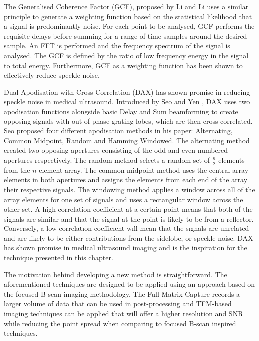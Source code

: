 The Generalised Coherence Factor (GCF), proposed by Li and Li\cite{li_adaptive_2003} uses a similar principle to generate a weighting function based on the statistical likelihood that a signal is predominantly noise. For each point to be analysed, GCF performs the requisite delays before summing for a range of time samples around the desired sample. An FFT is performed and the frequency spectrum of the signal is analysed. The GCF is defined by the ratio of low frequency energy in the signal to total energy. Furthermore, GCF as a weighting function has been shown to effectively reduce speckle noise.

Dual Apodisation with Cross-Correlation (DAX) has shown promise in reducing speckle noise in medical ultrasound. Introduced by Seo and Yen \cite{seo_sidelobe_2008}, DAX uses two apodisation functions alongside basic Delay and Sum beamforming to create opposing signals with out of phase grating lobes, which are then cross-correlated. Seo proposed four different apodisation methods in his paper: Alternating, Common Midpoint, Random and Hamming Windowed. The alternating method created two opposing apertures consisting of the odd and even numbered apertures respectively. The random method selects a random set of $\frac{n}{2}$ elements from the $n$ element array. The common midpoint method uses the central array elements in both apertures and assigns the elements from each end of the array their respective signals. The windowing method applies a window across all of the array elements for one set of signals and uses a rectangular window across the other set. A high correlation coefficient at a certain point means that both of the signals are similar and that the signal at the point is likely to be from a reflector. Conversely, a low correlation coefficient will mean that the signals are unrelated and are likely to be either contributions from the sidelobe, or speckle noise. DAX has shown promise in medical ultrasound imaging and is the inspiration for the technique presented in this chapter.

The motivation behind developing a new method is straightforward. The aforementioned techniques are designed to be applied using an approach based on the focused B-scan imaging methodology. The Full Matrix Capture records a larger volume of data that can be used in post-processing and TFM-based imaging techniques can be applied that will offer a higher resolution and SNR while reducing the point spread when comparing to focused B-scan inspired techniques\cite{holmes_post-processing_2005}.

